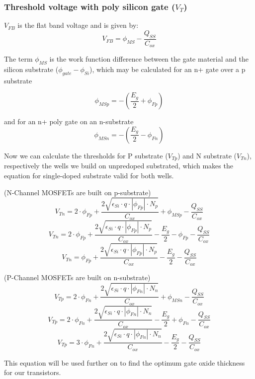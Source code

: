 \subsubsection{Threshold voltage with poly silicon gate ($V_T$)}
$V_{FB}$ is the flat band voltage and is given by:
\begin{equation}
V_{FB}
=
\phi_{MS} - \frac{Q_{SS}}{C_{ox}}
\end{equation}

The term $\phi_{MS}$ is the work function difference between the gate material and the silicon substrate ($\phi_{gate}-\phi_{Si}$), which may be calculated for an n+ gate over a p substrate

\begin{equation}
\phi_{MSp}
=
-(\frac{E_g}{2}+\phi_{Fp})
\end{equation}

and for an n+ poly gate on an n-substrate
\begin{equation}
\phi_{MSn}
=
-(\frac{E_g}{2}-\phi_{Fn})
\end{equation}

Now we can calculate the thresholds for P substrate ($V_{Tp}$) and N substrate  ($V_{Tn}$), respectively the wells we build on unpredoped substrated, which makes the equation for single-doped substrate valid for both wells.

(N-Channel MOSFETs are built on p-substrate)
\begin{equation}
V_{Tn} = 2 \cdot \phi_{Fp} + \frac{2 \sqrt{\epsilon_{Si}\cdot q \cdot \left| \phi_{Fp} \right| \cdot N_p}}{C_{ox}} + \phi_{MSp} - \frac{Q_{SS}}{C_{ox}}
\end{equation}
\begin{equation}
V_{Tn} = 2 \cdot \phi_{Fp} + \frac{2 \sqrt{\epsilon_{Si}\cdot q \cdot \left| \phi_{Fp} \right| \cdot N_p}}{C_{ox}} -\frac{E_g}{2} - \phi_{Fp} - \frac{Q_{SS}}{C_{ox}}
\end{equation}
\begin{equation}
V_{Tn} = \phi_{Fp} + \frac{2 \sqrt{\epsilon_{Si}\cdot q \cdot \left| \phi_{Fp} \right| \cdot N_p}}{C_{ox}} -\frac{E_g}{2} - \frac{Q_{SS}}{C_{ox}}
\end{equation}

(P-Channel MOSFETs are built on n-substrate)
\begin{equation}
V_{Tp} = 2 \cdot \phi_{Fn} + \frac{2 \sqrt{\epsilon_{Si}\cdot q \cdot \left| \phi_{Fn} \right| \cdot N_n}}{C_{ox}} + \phi_{MSn} - \frac{Q_{SS}}{C_{ox}}
\end{equation}
\begin{equation}
V_{Tp} = 2 \cdot \phi_{Fn} + \frac{2 \sqrt{\epsilon_{Si}\cdot q \cdot \left| \phi_{Fn} \right| \cdot N_n}}{C_{ox}} -\frac{E_g}{2} + \phi_{Fn} - \frac{Q_{SS}}{C_{ox}}
\end{equation}
\begin{equation}
V_{Tp} = 3 \cdot \phi_{Fn} + \frac{2 \sqrt{\epsilon_{Si}\cdot q \cdot \left| \phi_{Fn} \right| \cdot N_n}}{C_{ox}} -\frac{E_g}{2} - \frac{Q_{SS}}{C_{ox}}
\end{equation}

This equation will be used further on to find the optimum gate oxide thickness for our transistors.


